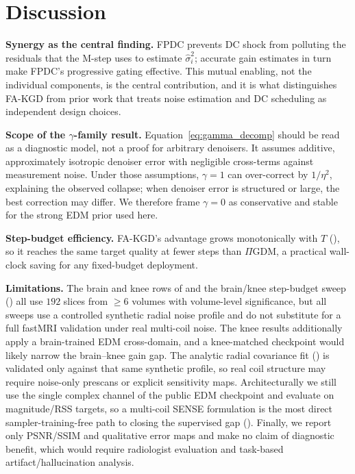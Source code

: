 \documentclass[10pt,twocolumn,letterpaper]{article}
\newcommand{\hatsig}{\hat{\sigma}}
\begin{document}
\section{Discussion}
\label{sec:discussion}

\textbf{Synergy as the central finding.} FPDC prevents DC shock from
polluting the residuals that the M-step uses to estimate $\hatsig_i^2$;
accurate gain estimates in turn make FPDC's progressive gating effective.
This mutual enabling, not the individual components, is the central
contribution, and it is what distinguishes FA-KGD from prior work that treats
noise estimation and DC scheduling as independent design choices.

\textbf{Scope of the $\gamma$-family result.}
Equation~\eqref{eq:gamma_decomp} should be read as a diagnostic model, not a
proof for arbitrary denoisers. It assumes additive, approximately isotropic
denoiser error with negligible cross-terms against measurement noise. Under
those assumptions, $\gamma{=}1$ can over-correct by $1/\eta^2$, explaining the
observed collapse; when denoiser error is structured or large, the best
correction may differ. We therefore frame $\gamma{=}0$ as conservative and
stable for the strong EDM prior used here.

\textbf{Step-budget efficiency.} FA-KGD's advantage grows monotonically
with $T$ (), so it reaches the same target quality at
fewer steps than $\Pi$GDM, a practical wall-clock saving for any
fixed-budget deployment.

\textbf{Limitations.}
The brain and knee rows of  and the brain/knee step-budget
sweep () all use $192$ slices from
$\geq 6$ volumes with volume-level significance, but all sweeps use a
controlled synthetic radial noise profile and do not substitute for a
full fastMRI validation under real multi-coil noise. The knee results 
additionally apply a brain-trained EDM cross-domain, and a knee-matched
checkpoint would likely narrow the brain--knee gain gap. The analytic radial covariance fit
() is validated only against that same synthetic
profile, so real coil structure may require noise-only prescans or
explicit sensitivity maps. Architecturally we still use the single
complex channel of the public EDM checkpoint and evaluate on
magnitude/RSS targets, so a multi-coil SENSE formulation is the most
direct sampler-training-free path to closing the supervised gap
(). Finally, we report only PSNR/SSIM and qualitative
error maps and make no claim of diagnostic benefit, which would require
radiologist evaluation and task-based artifact/hallucination analysis.
\end{document}
